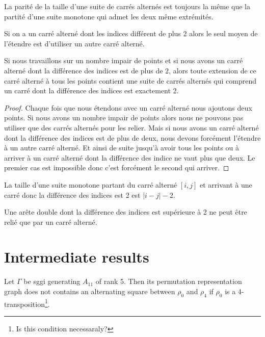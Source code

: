 \begin{lemma}
  La parité de la taille d'une suite de carrés alternés est toujours la même que la partité d'une suite monotone qui admet les deux même extrémités.
\end{lemma}

\begin{lemma}
  \label{lemma-continue-alternating-square}
  Si on a un carré alterné dont les indices différent de plus 2 alors le seul moyen de l'étendre est d'utiliser un autre carré alterné.
\end{lemma}

\begin{corollary}
  Si nous travaillons sur un nombre impair de points et si nous avons un carré alterné dont la différence des indices est de plus de 2, alors toute extension de ce carré alterné à tous les points contient une suite de carrés alternés qui comprend un carré dont la différence des indices est exactement 2.
\end{corollary}

\begin{proof}
  Chaque fois que nous étendons avec un carré alterné nous ajoutons deux points. Si nous avons un nombre impair de points alors nous ne pouvons pas utiliser que des carrés alternés pour les relier. Mais si nous avons un carré alterné dont la différence des indices est de plus de deux, nous devons forcément l'étendre à un autre carré alterné. Et ainsi de suite jusqu'à avoir tous les points ou à arriver à un carré alterné dont la différence des indice ne vaut plus que deux. Le premier cas est impossible donc c'est forcément le second qui arriver.
\end{proof}

\begin{lemma}
  La taille d'une suite monotone partant du carré alterné $[i, j]$ et arrivant à une carré donc la différence des indices est 2 est $|i - j| - 2$.
\end{lemma}

\begin{lemma}
  Une arête double dont la différence des indices est supérieure à 2 ne peut être relié que par un carré alterné.
\end{lemma}

\section{Intermediate results}

\begin{lemma}
  \label{lemma-forbidden-alternating-square}
  Let $\Gamma$ be sggi generating $A_{11}$ of rank 5. Then its permutation representation graph does not contains an alternating square between $\rho_0$ and $\rho_4$ if $\rho_0$ is a 4-transposition\footnote{Is this condition necessaraly?}.
\end{lemma}

